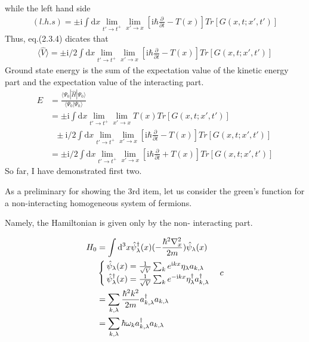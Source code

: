 ﻿\documentclass[twoside]{book}
\numberwithin{equation}{section}
\begin{document}
while the left hand side
\begin{align}
(l.h.s)=\pm \mathrm{i} \int \mathrm{d}x \lim_{t' \rightarrow t^+} \lim_{x' \rightarrow x} [\mathrm{i}\hbar\frac{\partial}{\partial t}-T(x)] Tr[G(x,t;x',t')] \nonumber
\end{align}
Thus, eq.(2.3.4) dicates that 
\begin{align}
\langle \hat V\rangle=\pm \mathrm{i}/2 \int \mathrm{d}x \lim_{t' \rightarrow t^+} \lim_{x' \rightarrow x} [\mathrm{i}\hbar\frac{\partial}{\partial t}-T(x)] Tr[G(x,t;x',t')] \nonumber
\end{align}
Ground state energy is the sum of the expectation value of the kinetic energy part and the expectation value of the interacting part.
\begin{align}
E&=\frac{\langle\Psi_0|\hat H
|\Psi_0\rangle}{\langle\Psi_0|\Psi_0\rangle} \nonumber \\
&=\pm \mathrm{i} \int \mathrm{d}x \lim_{t' \rightarrow t^+} \lim_{x' \rightarrow x} T(x) Tr[G(x,t;x',t')]\nonumber \\
&\ \ \ \pm \mathrm{i}/2 \int \mathrm{d}x \lim_{t' \rightarrow t^+} \lim_{x' \rightarrow x} [\mathrm{i}\hbar\frac{\partial}{\partial t}-T(x)] Tr[G(x,t;x',t')] \nonumber\\
&=\pm \mathrm{i}/2 \int \mathrm{d}x \lim_{t' \rightarrow t^+} \lim_{x' \rightarrow x} [\mathrm{i}\hbar\frac{\partial}{\partial t}+T(x)] Tr[G(x,t;x',t')] \nonumber
\end{align}
So far, I have demonstrated first two.

As a preliminary for showing the 3rd item, let us consider the green's function for a non-interacting homogeneous system of fermions.

Namely, the Hamiltonian is given only by the non- interacting part.

\begin{align}
H_0&=\int \mathrm{d}^3x \hat\psi^{\dagger}_{\lambda}(x)(-\frac{\hbar^2\nabla^2_x}{2m})\hat\psi_{\lambda}(x)\nonumber \\
&
\begin{cases}
\hat\psi_{\lambda}(x)=\frac{1}{\sqrt{V}}\sum_{k}e^{\mathrm{i}kx}\eta_{\lambda}a_{k,\lambda} \cr
\hat\psi^{\dagger}_{\lambda}(x)=\frac{1}{\sqrt{V}}\sum_{k}e^{-\mathrm{i}kx}\eta_{\lambda}^{\dagger}a_{k,\lambda}^{\dagger}
\end{cases}c\nonumber \\
&=\sum_{k,\lambda}\frac{\hbar^2k^2}{2m} a_{k,\lambda}^{\dagger}a_{k,\lambda} \nonumber \\
&=\sum_{k,\lambda}\hbar\omega_{k} a_{k,\lambda}^{\dagger}a_{k,\lambda} \nonumber
\end{align}
\end{document}
